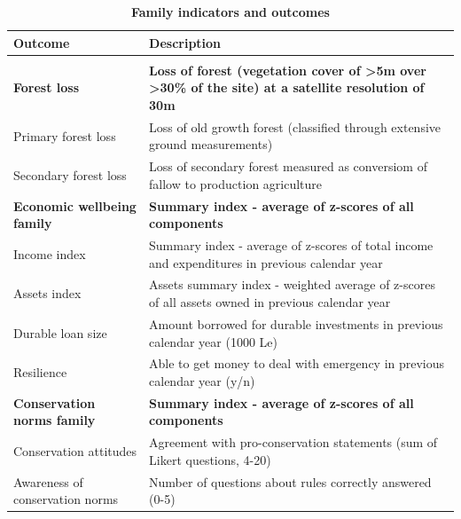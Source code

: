\documentclass[
]{article}
\begin{document}
\begin{table}[!h]

\caption{\label{tab:outcomes}\textbf{Family indicators and outcomes}}
\centering
\begin{threeparttable}
\begin{tabular}[t]{l>{\raggedright\arraybackslash}p{30em}}
\toprule
Outcome & Description\\
\midrule
\addlinespace[0.3em]
\multicolumn{2}{l}{\textbf{Primary outcomes}}\\
\textbf{\hspace{1em}Forest loss} & \textbf{Loss of forest (vegetation cover of >5m over >30\% of the site) at a satellite resolution of 30m}\\
\hspace{1em}Primary forest loss & Loss of old growth forest (classified through extensive ground measurements)\\
\hspace{1em}Secondary forest loss & Loss of secondary forest measured as conversiom of fallow to production agriculture\\
\textbf{\hspace{1em}Economic wellbeing family} & \textbf{Summary index - average of z-scores of all components}\\
\hspace{1em}Income index & Summary index - average of z-scores of total income and expenditures in previous calendar year\\
\hspace{1em}Assets index & Assets summary index - weighted average of z-scores of all assets owned in previous calendar year\\
\hspace{1em}Durable loan size & Amount borrowed for durable investments in previous calendar year (1000 Le)\\
\hspace{1em}Resilience & Able to get money to deal with emergency in previous calendar year (y/n)\\
\textbf{\hspace{1em}Conservation norms family} & \textbf{Summary index - average of z-scores of all components}\\
\hspace{1em}Conservation attitudes & Agreement with pro-conservation statements (sum of Likert questions, 4-20)\\
\hspace{1em}Awareness of conservation norms & Number of questions about rules correctly answered (0-5)\\

\end{tabular}
\end{threeparttable}
\end{table}
\end{document}
